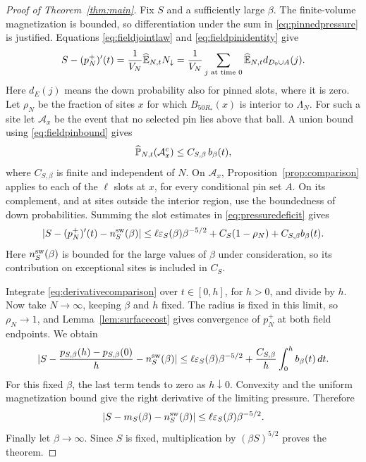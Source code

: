 \begin{proof}[Proof of Theorem~\ref{thm:main}]
Fix $S$ and a sufficiently large $\beta$.  The finite-volume
magnetization is bounded, so differentiation under the sum in
\eqref{eq:pinnedpressure} is justified.  Equations
\eqref{eq:fieldjointlaw} and \eqref{eq:fieldpinidentity} give
\begin{equation}\label{eq:pressuredeficit}
 S-(p_N^+)'(t)
  =\frac1{V_N}\widehat{\mathbb E}_{N,t}N_\downarrow
 =\frac1{V_N}\sum_{j\text{ at time }0}
                         \widehat{\mathbb E}_{N,t}d_{D_0\cup A}(j).
\end{equation}
Here $d_E(j)$ means the down probability also for pinned slots, where
it is zero.
Let $\rho_N$ be the fraction of sites $x$ for which
$B_{50R_*}(x)$ is interior to $\Lambda_N$.
For such a site let $\mathcal A_x$ be the event that no selected
pin lies above that ball.  A union bound using
\eqref{eq:fieldpinbound} gives
\[
 \widehat{\mathbb P}_{N,t}(\mathcal A_x^c)
 \le C_{S,\beta}\,b_\beta(t),
\]
where $C_{S,\beta}$ is finite and independent of $N$.
On $\mathcal A_x$, Proposition~\ref{prop:comparison} applies to
each of the $\ell$ slots at $x$, for every conditional pin set $A$.
On its complement, and at sites outside the interior region, use
the boundedness of down probabilities.  Summing the slot estimates
in \eqref{eq:pressuredeficit} gives
\begin{equation}\label{eq:derivativecomparison}
 \lvert S-(p_N^+)'(t)-n_S^{\rm sw}(\beta)\rvert
 \le \ell\varepsilon_S(\beta)\beta^{-5/2}
       +C_S(1-\rho_N)+C_{S,\beta}b_\beta(t).
\end{equation}
Here $n_S^{\rm sw}(\beta)$ is bounded for the large values of $\beta$
under consideration, so its contribution on exceptional
sites is included in $C_S$.

Integrate \eqref{eq:derivativecomparison} over $t\in[0,h]$, for
$h>0$, and divide by $h$.  Now take $N\to\infty$, keeping
$\beta$ and $h$ fixed.  The radius is fixed in this limit, so
$\rho_N\to1$, and Lemma~\ref{lem:surfacecost} gives convergence
of $p_N^+$ at both field endpoints.  We obtain
\[
 \lvert S-\frac{p_{S,\beta}(h)-p_{S,\beta}(0)}h
                    -n_S^{\rm sw}(\beta)\rvert
 \le \ell\varepsilon_S(\beta)\beta^{-5/2}
       +\frac{C_{S,\beta}}h\int_0^h b_\beta(t)\,dt.
\]
For this fixed $\beta$, the last term tends to zero as
$h\downarrow0$.  Convexity and the uniform magnetization bound
give the right derivative of the limiting pressure.  Therefore
\[
 \lvert S-m_S(\beta)-n_S^{\rm sw}(\beta)\rvert
 \le\ell\varepsilon_S(\beta)\beta^{-5/2}.
\]
Finally let $\beta\to\infty$.  Since $S$ is fixed, multiplication
by $(\beta S)^{5/2}$ proves the theorem.
\end{proof}

